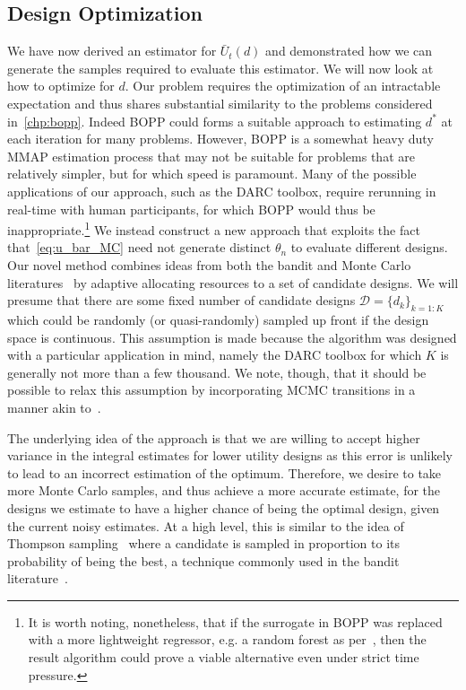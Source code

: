 \subsection{Design Optimization}
\label{sec:design:auto:optimization}
We have now derived an estimator for $\bar{U}_t(d)$ and demonstrated how we can generate the
samples required to evaluate this estimator.  We will now look at how to optimize for $d$.  
Our problem requires the optimization of an intractable expectation and thus shares substantial
similarity to the problems considered in~\ref{chp:bopp}.  Indeed BOPP could forms a suitable
approach to estimating $d^*$ at each iteration for many problems.  However, BOPP is a somewhat heavy
duty MMAP estimation process that may not be suitable for problems that are relatively simpler,
but for which speed is paramount.  Many of the possible applications of our approach, such
as the DARC toolbox, require rerunning in real-time with human participants, for which BOPP would
thus be inappropriate.\footnote{It is worth noting, nonetheless, that if the surrogate in BOPP
	was replaced with a more lightweight regressor, e.g. a random forest as per~\cite{hutter2011sequential},
	then the result algorithm could prove a viable alternative even under strict time pressure.}
We instead construct a new approach
that exploits the fact that~\eqref{eq:u_bar_MC} need not generate distinct $\theta_n$ to evaluate
different designs.  Our novel method combines ideas from both the bandit and
Monte Carlo literatures~\citep{amzal2006bayesian,neufeld2014adaptive} by adaptive 
allocating resources to a set of candidate designs.  We will presume that there are some fixed number 
of candidate designs $\mathcal{D} = \{d_k\}_{k=1:K}$ which could be randomly (or quasi-randomly)
sampled up front if the design space is continuous.  This assumption is made because the 
algorithm was designed with a particular application in mind, namely the DARC toolbox for which $K$
is generally not more than a few thousand.  We note, though, that it should be possible to relax this
assumption by incorporating MCMC transitions in a manner akin to~\citep{amzal2006bayesian}.

The underlying idea of the approach is that we are willing to accept higher variance in the integral estimates for lower utility designs as this error is unlikely to lead to an incorrect estimation of the optimum.
Therefore, we desire to take more Monte Carlo samples, and thus achieve a more accurate estimate, for the designs we estimate to have a higher chance of being the optimal design, given the current noisy estimates.
At a high level, this is similar  to the idea of Thompson sampling~\citep{thompson1933likelihood} 
where a candidate is sampled in proportion to its probability of being the best, 
a technique commonly used in the bandit literature~\citep{agrawal2012analysis}.

